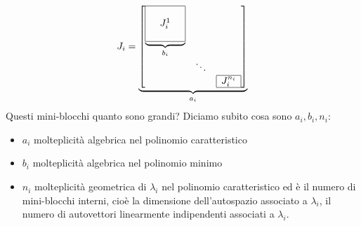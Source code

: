\documentclass[10pt,a4paper]{book}
\begin{document}
\begin{equation*}
J_i =\underbrace{\begin{bmatrix}
\underbrace{\begin{array}{|c c c|}
\hline
 &  & \\
 & J^{1}_i & \\
 &  & \\
\hline
\end{array}}_{b_i} &  & \\
 & \ddots  & \\
 &  & \begin{array}{|c|}
\hline
J^{n_i}_i\\
\hline
\end{array}
\end{bmatrix}}_{a_i}
\end{equation*}
Questi mini-blocchi quanto sono grandi? Diciamo subito cosa sono $a_i ,b_i ,n_i$:
\begin{itemize}
\item $a_i$ molteplicità algebrica nel polinomio caratteristico
\item $b_i$ molteplicità algebrica nel polinomio minimo
\item $n_i$ molteplicità geometrica di $\lambda _i$ nel polinomio caratteristico ed è il numero di mini-blocchi interni, cioè la dimensione dell'autospazio associato a $\lambda _i$, il numero di autovettori linearmente indipendenti associati a $\lambda _i$.
\end{itemize}
\end{document}
